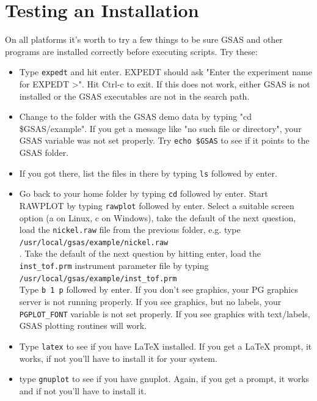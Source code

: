 \section{Testing an Installation}
On all platforms it's worth to try a few things to be sure GSAS and other programs are installed correctly before executing scripts. Try these:
\begin{itemize}
\item Type \texttt{expedt} and hit enter. EXPEDT should ask "Enter the experiment name for EXPEDT >". Hit Ctrl-c to exit. If this does not work, either GSAS is not installed or the GSAS executables are not in the search path.
\item Change to the folder with the GSAS demo data by typing "cd \$GSAS/example". If you get a message like "no such file or directory", your GSAS variable was not set properly. Try \texttt{echo \$GSAS} to see if it points to the GSAS folder.
\item If you got there, list the files in there by typing \texttt{ls} followed by enter.
\item Go back to your home folder by typing \texttt{cd} followed by enter. Start RAWPLOT by typing \texttt{rawplot} followed by enter. Select a suitable screen option (a on Linux, c on Windows), take the default of the next question, load the \texttt{nickel.raw} file from the previous folder, e.g. type \texttt{\\/usr/local/gsas/example/nickel.raw\\}. Take the default of the next question by hitting enter, load the \texttt{inst\_tof.prm} instrument parameter file by typing \texttt{\\/usr/local/gsas/example/inst\_tof.prm\\} Type \texttt{b 1 p} followed by enter. If you don't see graphics, your PG graphics server is not running properly. If you see graphics, but no labels, your \texttt{PGPLOT\_FONT} variable is not set properly. If you see graphics with text/labels, GSAS plotting routines will work.
\item Type \texttt{latex} to see if you have \LaTeX{}  installed. If you get a \LaTeX{}  prompt, it works, if not you'll have to install it for your system. 
\item type \texttt{gnuplot} to see if you have gnuplot. Again, if you get a prompt, it works and if not you'll have to install it.
\end{itemize}
